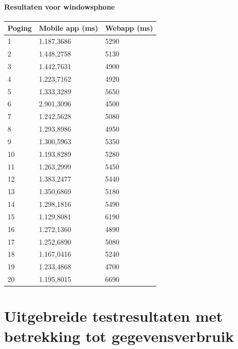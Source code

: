 \documentclass[pdftex,a4paper,12pt,twoside]{report}
\begin{document}
\subsubsection{Resultaten voor windowsphone}
\begin{center}
  \begin{tabular}{ | l | l | l |}
      \hline
      Poging & Mobile app (ms) & Webapp (ms)
      \\ \hline
      1 & 1.187,3686 & 5290
      \\ \hline
      2 & 1.448,2758 & 5130
      \\ \hline
      3 & 1.442,7631 & 4900
      \\ \hline
      4 & 1.223,7162 & 4920
      \\ \hline
      5 & 1.333,3289 & 5650
      \\ \hline
      6 & 2.901,3096 & 4500
      \\ \hline
      7 & 1.242,5628 & 5080
      \\ \hline
      8 & 1.293,8986 & 4950
      \\ \hline
      9 & 1.300,5963 & 5350
      \\ \hline
      10 & 1.193,8289 & 5280
      \\ \hline
      11 & 1.263,2999 & 5450
      \\ \hline
      12 & 1.383,2477 & 5440
      \\ \hline
      13 & 1.350,6869 & 5180
      \\ \hline
      14 & 1.298,1816 & 5490
      \\ \hline
      15 & 1.129,8081 & 6190
      \\ \hline
      16 & 1.272,1360 & 4890
      \\ \hline
      17 & 1.252,6890 & 5080
      \\ \hline
      18 & 1.167,0416 & 5240
      \\ \hline
      19 & 1.233,4868 & 4700
      \\ \hline
      20 & 1.195,8015 & 6690
      \\ \hline
   \end{tabular}
\end{center}

\chapter{Uitgebreide testresultaten met betrekking tot gegevensverbruik}
\end{document}
